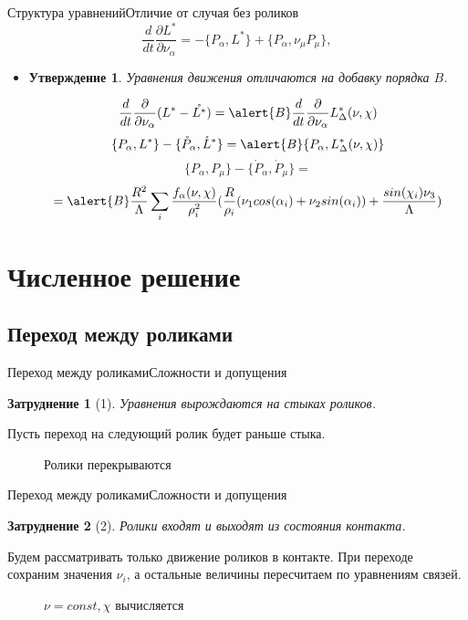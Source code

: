 \documentclass{beamer}
\newtheorem{stmt}{Утверждение}
\newtheorem{prblm}{Затруднение}
\begin{document}
\begin{frame}{Структура уравнений}{Отличие от случая без роликов}
  $$ \frac{d}{dt}\frac{\partial L^{*}}{\partial \nu_\alpha} = - \{P_\alpha, L^{*}\} + \{P_\alpha, \nu_\mu P_\mu\}, $$
  \begin{itemize}
  \item {
    \begin{stmt}
    Уравнения движения отличаются на добавку порядка $B$.
    \end{stmt}
    $$ \frac{d}{dt}\frac{\partial }{\partial \nu_\alpha}(L^{*} - \mathring{L^{*}}) = \alert{B}\frac{d}{dt}\frac{\partial}{\partial \nu_\alpha}L^{*}_\Delta(\nu, \chi) $$
    $$ \{P_\alpha, L^{*}\} - \{\mathring{P}_\alpha, \mathring{L}^{*}\} = \alert{B}\{ P_\alpha, L^{*}_\Delta(\nu, \chi) \} $$
    $$ \{P_\alpha, P_\mu\} - \{\mathring{P}_\alpha, \mathring{P}_\mu\}  = $$
    $$ = \alert{B}\frac{R^2}{\Lambda}\sum_i\frac{f_\alpha(\nu, \chi)}{\rho^2_i}(\frac{R}{\rho_i}(\nu_1cos(\alpha_i) + \nu_2sin(\alpha_i)) + \frac{sin(\chi_i)\nu_3}{\Lambda})$$
  }
  \end{itemize}
\end{frame}

\section{Численное решение}

\subsection{Переход между роликами}

\begin{frame}{Переход между роликами}{Сложности и допущения}
    \begin{prblm}[1]\label{p1}
    Уравнения вырождаются на стыках роликов.
    \end{prblm}
    Пусть переход на следующий ролик будет раньше стыка.
    \begin{figure}
        \centering
        \caption{Ролики перекрываются}
    \end{figure}
\end{frame}

\begin{frame}{Переход между роликами}{Сложности и допущения}
    \begin{prblm}[2]\label{p2}
    Ролики входят и выходят из состояния контакта.
    \end{prblm}
    Будем рассматривать только движение роликов в контакте. При переходе сохраним значения $\nu_i$, а остальные величины пересчитаем по уравнениям связей.
    \begin{figure}
        \centering
        \caption{$\nu = const, \chi$ вычисляется}
    \end{figure}
\end{frame}
\end{document}
